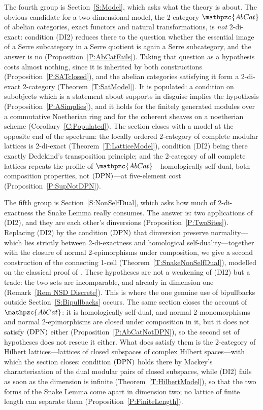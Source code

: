 \documentclass[reqno,a4paper]{amsart}
\numberwithin{equation}{section}
\theoremstyle{plain}
\theoremstyle{definition}
\def\nameit#1{\textrm{#1}~}
\def\thex{\nameit{Theorem}}
\def\prox{\nameit{Proposition}}
\def\corx{\nameit{Corollary}}
\def\remx{\nameit{Remark}}
\newcommand{\catfont}[1]{\ensuremath{\mathpzc{#1}}\xspace}
\newcommand{\AbCat}{\catfont{AbCat}}
\renewcommand{\1}{\onecat{1}}
\newcommand{\DPN}{\textup{(DPN)}}
\begin{document}
The fourth group is Section~\ref{S:Model}, which asks what the theory is about. The obvious candidate for a two-dimensional model, the 2-category \(\AbCat\) of abelian categories, exact functors and natural transformations, is \emph{not} 2-di-exact: condition (DI2) reduces there to the question whether the essential image of a Serre subcategory in a Serre quotient is again a Serre subcategory, and the answer is no (\prox\ref{P:AbCatFails}). Taking that question as a hypothesis costs almost nothing, since it is inherited by both constructions (\prox\ref{P:SATclosed}), and the abelian categories satisfying it form a 2-di-exact 2-category (\thex\ref{T:SatModel}). It is populated: a condition on subobjects which is a statement about supports in disguise implies the hypothesis (\prox\ref{P:ASimplies}), and it holds for the finitely generated modules over a commutative Noetherian ring and for the coherent sheaves on a noetherian scheme (\corx\ref{C:Populated}). The section closes with a model at the opposite end of the spectrum: the locally ordered 2-category of complete modular lattices is 2-di-exact (\thex\ref{T:LatticeModel}), condition \textup{(DI2)} being there exactly Dedekind's transposition principle; and the 2-category of all complete lattices repeats the profile of \(\AbCat\)---homologically self-dual, both composition properties, not \(\DPN\)---at five-element cost (\prox\ref{P:SupNotDPN}).

The fifth group is Section~\ref{S:NonSelfDual}, which asks how much of 2-di-exactness the Snake Lemma really consumes. The answer is: two applications of \textup{(DI2)}, and they are each other's dinversions (\prox\ref{P:TwoSites}). Replacing \textup{(DI2)} by the condition \(\DPN\) that dinversion preserve normality---which lies strictly between 2-di-exactness and homological self-duality---together with the closure of normal 2-epimorphisms under composition, we give a second construction of the connecting 1-cell (\thex\ref{T:SnakeNonSelfDual}), modelled on the classical proof of \cite{Borceux-Bourn}. These hypotheses are not a weakening of \textup{(DI2)} but a trade: the two sets are incomparable, and already in dimension one (\remx\ref{Rem NSD Discrete}). This is where the one genuine use of bipullbacks outside Section~\ref{S:Bipullbacks} occurs. The same section closes the account of \(\AbCat\): it is homologically self-dual, and normal 2-monomorphisms and normal 2-epimorphisms are closed under composition in it, but it does not satisfy \(\DPN\) either (\prox\ref{P:AbCatNotDPN}), so the second set of hypotheses does not rescue it either. What does satisfy them is the 2-category of Hilbert lattices---lattices of closed subspaces of complex Hilbert spaces---with which the section closes: condition \(\DPN\) holds there by Mackey's characterisation of the dual modular pairs of closed subspaces, while \textup{(DI2)} fails as soon as the dimension is infinite (\thex\ref{T:HilbertModel}), so that the two forms of the Snake Lemma come apart in dimension two; no lattice of finite length can separate them (\prox\ref{P:FiniteLength}).
\end{document}
